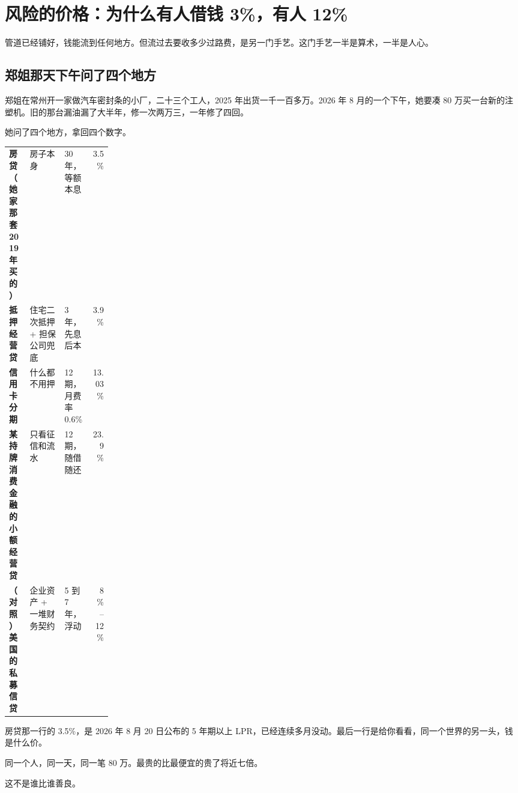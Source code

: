 \chapter{风险的价格：为什么有人借钱 3\%，有人 12\%}

\begin{ledetext}
管道已经铺好，钱能流到任何地方。但流过去要收多少过路费，是另一门手艺。这门手艺一半是算术，一半是人心。
\end{ledetext}

\section{郑姐那天下午问了四个地方}

郑姐在常州开一家做汽车密封条的小厂，二十三个工人，2025 年出货一千一百多万。2026 年 8 月的一个下午，她要凑 80 万买一台新的注塑机。旧的那台漏油漏了大半年，修一次两万三，一年修了四回。

她问了四个地方，拿回四个数字。

\begin{tablewrap}
\begin{xltabular}{\linewidth}{>{\raggedright\arraybackslash}p{0.20\linewidth}XXr}
\toprule
{} &  &  &  \\
\midrule
\textbf{房贷（她家那套 2019 年买的）} & 房子本身 & 30 年，等额本息 & 3.5\% \\
\textbf{抵押经营贷} & 住宅二次抵押 + 担保公司兜底 & 3 年，先息后本 & 3.9\% \\
\textbf{信用卡分期} & 什么都不用押 & 12 期，月费率 0.6\% & 13.03\% \\
\textbf{某持牌消费金融的小额经营贷} & 只看征信和流水 & 12 期，随借随还 & 23.9\% \\
\textbf{（对照）美国的私募信贷} & 企业资产 + 一堆财务契约 & 5 到 7 年，浮动 & 8\%–12\% \\
\bottomrule
\end{xltabular}
\end{tablewrap}

房贷那一行的 3.5\%，是 2026 年 8 月 20 日公布的 5 年期以上 LPR，已经连续多月没动。最后一行是给你看看，同一个世界的另一头，钱是什么价。

同一个人，同一天，同一笔 80 万。最贵的比最便宜的贵了将近七倍。

这不是谁比谁善良。

